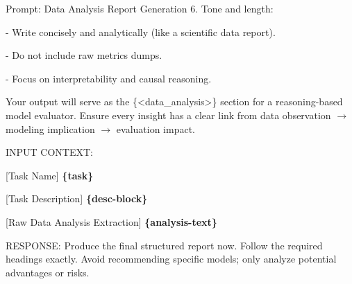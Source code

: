 \begin{promptbox}{Prompt: Data Analysis Report Generation}
6. Tone and length:

    - Write concisely and analytically (like a scientific data report).
    
    - Do not include raw metrics dumps.
    
    - Focus on interpretability and causal reasoning.
\newline

Your output will serve as the \{<data\_analysis>\} section for a reasoning-based model evaluator.
Ensure every insight has a clear link from data observation $\to$ modeling implication $\to$ evaluation impact.

INPUT CONTEXT:

[Task Name]
\textbf{\{task\}}

[Task Description]
\textbf{\{desc-block\}}

[Raw Data Analysis Extraction]
\textbf{\{analysis-text\}}
\newline

RESPONSE: Produce the final structured report now. Follow the required headings exactly. Avoid recommending specific models; only analyze potential advantages or risks.
\end{promptbox}
\caption{Prompt used to instruct the LLM for generating data analysis report from the code execution result.} %
\label{fig:appendix_da_report_prompt} %


\vspace{2em}


